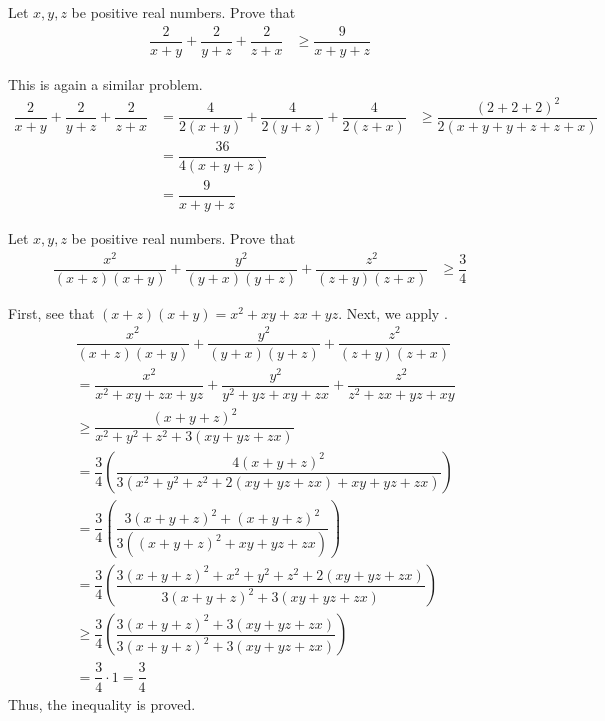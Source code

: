 \documentclass{subfile}
\begin{document}
		\begin{problem}
			Let $x,y,z$ be positive real numbers. Prove that
				\begin{align*}
					\dfrac{2}{x+y}+\dfrac{2}{y+z}+\dfrac{2}{z+x}
						& \geq \dfrac{9}{x+y+z}
				\end{align*}
			
				\begin{solution}
					This is again a similar problem.
						\begin{align*}
							\dfrac{2}{x+y}+\dfrac{2}{y+z}+\dfrac{2}{z+x}
								& = \dfrac{4}{2(x+y)}+\dfrac{4}{2(y+z)}+\dfrac{4}{2(z+x)}
								& \geq \dfrac{(2+2+2)^{2}}{2(x+y+y+z+z+x)}\\
								& = \dfrac{36}{4(x+y+z)}\\
								& = \dfrac{9}{x+y+z}
						\end{align*}
				\end{solution}
		\end{problem}
	
		\begin{problem}
			Let $x,y,z$ be positive real numbers. Prove that
				\begin{align*}
					\dfrac{x^{2}}{(x+z)(x+y)}+\dfrac{y^{2}}{(y+x)(y+z)}+\dfrac{z^{2}}{(z+y)(z+x)}
						& \geq \dfrac{3}{4}
				\end{align*}
			
				\begin{solution}
					First, see that $(x+z)(x+y)=x^{2}+xy+zx+yz$. Next, we apply \nameref{thm:engel}.
						\begin{align*}
								& \dfrac{x^{2}}{(x+z)(x+y)}+\dfrac{y^{2}}{(y+x)(y+z)}+\dfrac{z^{2}}{(z+y)(z+x)}\\
								& = \dfrac{x^{2}}{x^{2}+xy+zx+yz}+\dfrac{y^{2}}{y^{2}+yz+xy+zx}+\dfrac{z^{2}}{z^{2}+zx+yz+xy}\\
								& \geq \dfrac{(x+y+z)^{2}}{x^{2}+y^{2}+z^{2}+3(xy+yz+zx)}\\
								& = \dfrac{3}{4}\left(\dfrac{4(x+y+z)^{2}}{3(x^{2}+y^{2}+z^{2}+2(xy+yz+zx)+xy+yz+zx)}\right)\\
								& = \dfrac{3}{4}\left(\dfrac{3(x+y+z)^{2}+(x+y+z)^{2}}{3((x+y+z)^{2}+xy+yz+zx)}\right)\\
								& = \dfrac{3}{4}\left(\dfrac{3(x+y+z)^{2}+x^{2}+y^{2}+z^{2}+2(xy+yz+zx)}{3(x+y+z)^{2}+3(xy+yz+zx)}\right)\\
								& \geq \dfrac{3}{4}\left(\dfrac{3(x+y+z)^{2}+3(xy+yz+zx)}{3(x+y+z)^{2}+3(xy+yz+zx)}\right)\\
								& = \dfrac{3}{4}\cdot1=\dfrac{3}{4}
						\end{align*}
					Thus, the inequality is proved.
				\end{solution}
		\end{problem}
	
\end{document}
